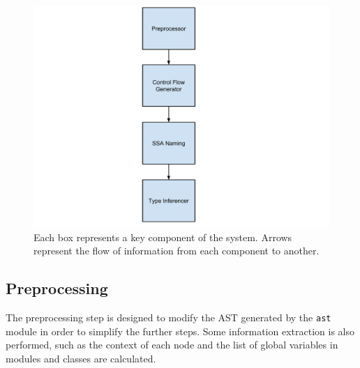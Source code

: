 \documentclass[12pt, titlepage]{article}
\begin{document}
\begin{figure}
\centering
\includegraphics[scale=0.5]{images/systemStructure.pdf}
\caption{Each box represents a key component of the system. Arrows represent the flow of information from each component to another.}
\label{fig:systemStructure}
\end{figure}

\subsection{Preprocessing}
The preprocessing step is designed to modify the AST generated by the \texttt{ast} module in order to simplify the further steps. Some information extraction is also performed, such as the context of each node and the list of global variables in modules and classes are calculated.
\end{document}
